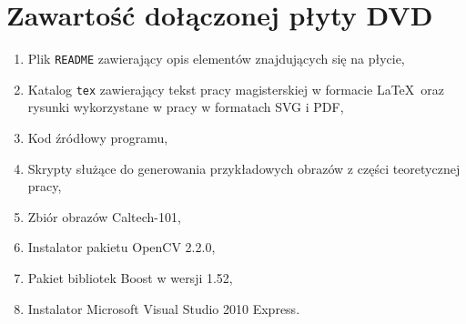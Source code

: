 \chapter{Zawartość dołączonej płyty DVD}

\begin{enumerate}
  \item Plik \texttt{README} zawierający opis elementów znajdujących się na płycie,
  \item Katalog \texttt{tex} zawierający tekst pracy magisterskiej w formacie \LaTeX~oraz rysunki wykorzystane w pracy w formatach SVG i PDF,
  \item Kod źródłowy programu,
  \item Skrypty służące do generowania przykładowych obrazów z części teoretycznej pracy,
  \item Zbiór obrazów Caltech-101,
  \item Instalator pakietu OpenCV 2.2.0,
  \item Pakiet bibliotek Boost w wersji 1.52,
  \item Instalator Microsoft Visual Studio 2010 Express.
\end{enumerate}